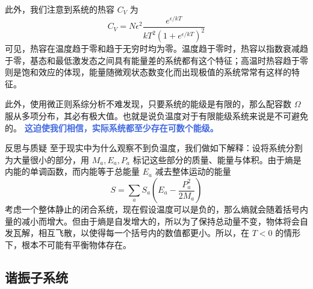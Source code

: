 此外，我们注意到系统的热容 $C_V$ 为
\begin{equation}
    C_V = N\epsilon^2\frac{e^{\epsilon / kT}}{kT^2 (1+ e^{\epsilon / kT})^2} 
\end{equation}
可见，热容在温度趋于零和趋于无穷时均为零。温度趋于零时，热容以指数衰减趋于零，基态和最低激发态之间具有能量差的系统都有这个特征；高温时热容趋于零则是饱和效应的体现，能量随微观状态数变化而出现极值的系统常常有这样的特征。

此外，使用微正则系综分析不难发现，只要系统的能级是有限的，那么配容数 $\Omega$ 服从多项分布，其必有极大值。也就是说负温度对于有限能级系统来说是不可避免的。 \textcolor{RoyalBlue}{\textbf{\kaishu 这迫使我们相信，实际系统都至少存在可数个能级。}} 

\begin{justification}{\kaishu 反思与质疑}
\kaishu \fontsize{11pt}{16pt}
\quad\quad 至于现实中为什么观察不到负温度，我们做如下解释：设将系统分割为大量很小的部分，用 $M_a, E_a, P_a$ 标记这些部分的质量、能量与体积。由于熵是内能的单调函数，而内能等于总能量 $E_a$ 减去整体运动的能量
\begin{equation}
    S = \sum_a S_a\left(E_a - \frac{P_a^2}{2M_a} \right)
\end{equation}
考虑一个整体静止的闭合系统，现在假设温度可以是负的，那么熵就会随着括号内量的减小而增大。但由于熵是自发增大的，所以为了保持总动量不变，物体将会自发瓦解，相互飞散，以使得每一个括号内的数值都更小。所以，在 $T < 0$ 的情形下，根本不可能有平衡物体存在。
\end{justification}

\subsection{谐振子系统}

